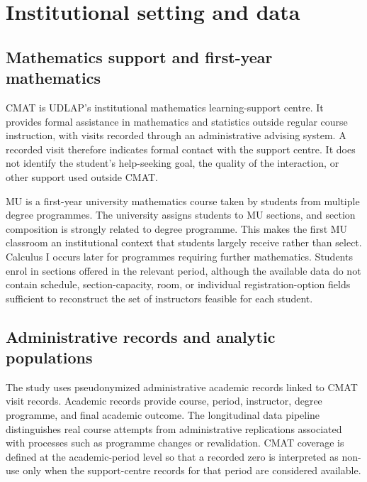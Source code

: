 \section{Institutional setting and data}

\subsection{Mathematics support and first-year mathematics}

CMAT is UDLAP's institutional mathematics learning-support centre. It provides formal assistance in mathematics and statistics outside regular course instruction, with visits recorded through an administrative advising system. A recorded visit therefore indicates formal contact with the support centre. It does not identify the student's help-seeking goal, the quality of the interaction, or other support used outside CMAT.

MU is a first-year university mathematics course taken by students from multiple degree programmes. The university assigns students to MU sections, and section composition is strongly related to degree programme. This makes the first MU classroom an institutional context that students largely receive rather than select. Calculus I occurs later for programmes requiring further mathematics. Students enrol in sections offered in the relevant period, although the available data do not contain schedule, section-capacity, room, or individual registration-option fields sufficient to reconstruct the set of instructors feasible for each student.


\subsection{Administrative records and analytic populations}

The study uses pseudonymized administrative academic records linked to CMAT visit records. Academic records provide course, period, instructor, degree programme, and final academic outcome. The longitudinal data pipeline distinguishes real course attempts from administrative replications associated with processes such as programme changes or revalidation. CMAT coverage is defined at the academic-period level so that a recorded zero is interpreted as non-use only when the support-centre records for that period are considered available.

